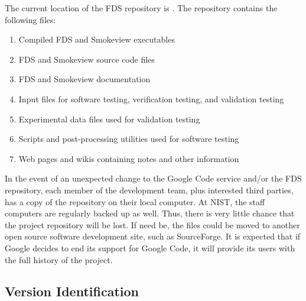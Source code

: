 \documentclass[11pt]{book}
\begin{document}
The current location of the FDS repository is \href{http://fds-smv.googlecode.com/svn/trunk/}{}. The repository contains the following files:
\begin{enumerate}
\item Compiled FDS and Smokeview executables
\item FDS and Smokeview source code files
\item FDS and Smokeview documentation
\item Input files for software testing, verification testing, and validation testing
\item Experimental data files used for validation testing
\item Scripts and post-processing utilities used for software testing
\item Web pages and wikis containing notes and other information
\end{enumerate}
In the event of an unexpected change to the Google Code service and/or the FDS repository, each member of the development team, plus interested third parties, has a copy of the repository on their local computer. At NIST, the staff computers are regularly backed up as well. Thus, there is very little chance that the project repository will be lost. If need be, the files could be moved to another open source software development site, such as SourceForge. It is expected that if Google decides to end its support for Google Code, it will provide its users with the full history of the project.

\subsection{Version Identification}
\end{document}
